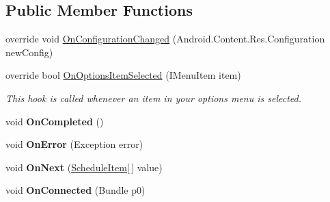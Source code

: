 \subsection*{Public Member Functions}
\begin{DoxyCompactItemize}
\item 
override void \hyperlink{class_w_c_c_mobile_1_1_campus_map_activity_a916ad58c240808114b3b7caccf5eb3ef}{On\+Configuration\+Changed} (Android.\+Content.\+Res.\+Configuration new\+Config)
\item 
override bool \hyperlink{class_w_c_c_mobile_1_1_campus_map_activity_a5691fdf085a4f060de472da2e3eba7ed}{On\+Options\+Item\+Selected} (I\+Menu\+Item item)
\begin{DoxyCompactList}\small\item\em This hook is called whenever an item in your options menu is selected. \end{DoxyCompactList}\item 
void {\bfseries On\+Completed} ()\hypertarget{class_w_c_c_mobile_1_1_campus_map_activity_a7dd1c57327ee20a030821feca778d854}{}\label{class_w_c_c_mobile_1_1_campus_map_activity_a7dd1c57327ee20a030821feca778d854}

\item 
void {\bfseries On\+Error} (Exception error)\hypertarget{class_w_c_c_mobile_1_1_campus_map_activity_a56f551e2949aeaa87c8062ae68582291}{}\label{class_w_c_c_mobile_1_1_campus_map_activity_a56f551e2949aeaa87c8062ae68582291}

\item 
void {\bfseries On\+Next} (\hyperlink{class_w_c_c_mobile_1_1_models_1_1_schedule_item}{Schedule\+Item}\mbox{[}$\,$\mbox{]} value)\hypertarget{class_w_c_c_mobile_1_1_campus_map_activity_a95ba3fa2bd54717d8ba117212ea029b7}{}\label{class_w_c_c_mobile_1_1_campus_map_activity_a95ba3fa2bd54717d8ba117212ea029b7}

\item 
void {\bfseries On\+Connected} (Bundle p0)\hypertarget{class_w_c_c_mobile_1_1_campus_map_activity_a28dd11f186a7e08687fa050b813d0769}{}\label{class_w_c_c_mobile_1_1_campus_map_activity_a28dd11f186a7e08687fa050b813d0769}


\end{DoxyCompactItemize}
